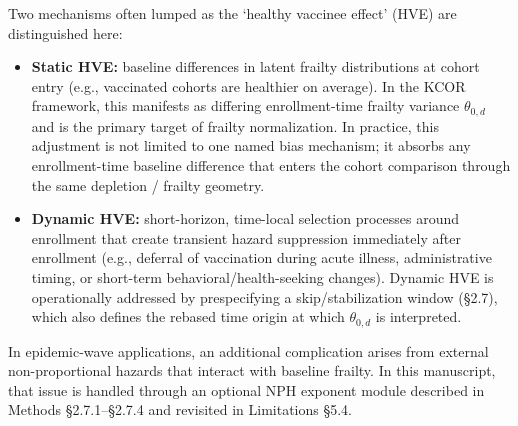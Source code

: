 \documentclass[
]{article}
\begin{document}
Two mechanisms often lumped as the `healthy vaccinee effect' (HVE) are
distinguished here:

\begin{itemize}
\item
  \textbf{Static HVE:} baseline differences in latent frailty
  distributions at cohort entry (e.g., vaccinated cohorts are healthier
  on average). In the KCOR framework, this manifests as differing
  enrollment-time frailty variance \(\theta_{0,d}\) and is the primary
  target of frailty normalization. In practice, this adjustment is not
  limited to one named bias mechanism; it absorbs any enrollment-time
  baseline difference that enters the cohort comparison through the same
  depletion / frailty geometry.
\item
  \textbf{Dynamic HVE:} short-horizon, time-local selection processes
  around enrollment that create transient hazard suppression immediately
  after enrollment (e.g., deferral of vaccination during acute illness,
  administrative timing, or short-term behavioral/health-seeking
  changes). Dynamic HVE is operationally addressed by prespecifying a
  skip/stabilization window (§2.7), which also defines the rebased time
  origin at which \(\theta_{0,d}\) is interpreted.
\end{itemize}

In epidemic-wave applications, an additional complication arises from
external non-proportional hazards that interact with baseline frailty.
In this manuscript, that issue is handled through an optional NPH
exponent module described in Methods §2.7.1--§2.7.4 and revisited in
Limitations §5.4.
\end{document}
